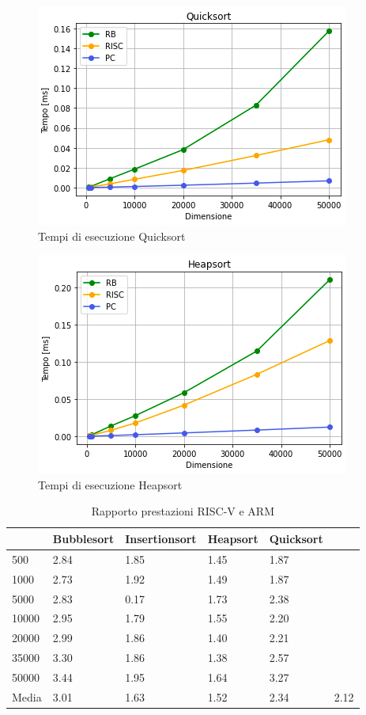 \documentclass[12pt, a4paper]{report}
\begin{document}
\begin{figure}[ht]
\centering
 \includegraphics[scale=0.8]{Img/GraficiSorting/Quicksort_All.PNG}
 \caption{Tempi di esecuzione Quicksort}
\end{figure}

\begin{figure}[ht]
\centering
 \includegraphics[scale=0.8]{Img/GraficiSorting/Heapsort_All}
 \caption{Tempi di esecuzione Heapsort}
\end{figure}


\begin{table}[ht]
\centering
\begin{tabular}{|l|l|l|l|l|l|}
\hline
      & Bubblesort & Insertionsort & Heapsort & Quicksort &      \\ \hline
500   & 2.84       & 1.85          & 1.45     & 1.87      &      \\ \hline
1000  & 2.73       & 1.92          & 1.49     & 1.87      &      \\ \hline
5000  & 2.83       & 0.17          & 1.73     & 2.38      &      \\ \hline
10000 & 2.95       & 1.79          & 1.55     & 2.20      &      \\ \hline
20000 & 2.99       & 1.86          & 1.40     & 2.21      &      \\ \hline
35000 & 3.30       & 1.86          & 1.38     & 2.57      &      \\ \hline
50000 & 3.44       & 1.95          & 1.64     & 3.27      &      \\ \hline
Media & 3.01       & 1.63          & 1.52     & 2.34      & 2.12 \\ \hline
\end{tabular}
\caption{Rapporto prestazioni RISC-V e ARM}
\label{Tab:confrontoPrestazioniSorting}
\end{table}
\end{document}
